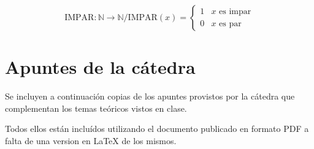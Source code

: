 \begin{equation} \label{eq:anexo-par}
    \mathrm{IMPAR}: \mathbb{N} \to \mathbb{N} / 
    \mathrm{IMPAR} (x) =
    \begin{cases}
        1 & x \text{ es impar} \\
        0 & x \text{ es par}
    \end{cases}
\end{equation}

\section{Apuntes de la cátedra}

Se incluyen a continuación copias de los apuntes provistos por la cátedra
que complementan los temas teóricos vistos en clase.

Todos ellos están incluídos utilizando el documento publicado en formato PDF 
a falta de una version en {\LaTeX} de los mismos.





